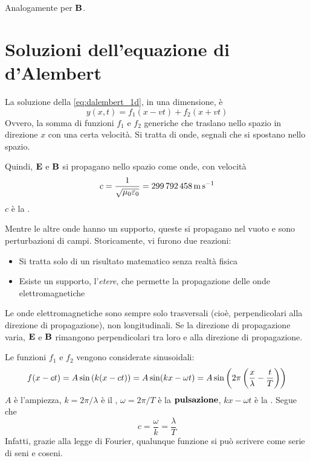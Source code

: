 Analogamente per $\mathbf{B}$.

\section{Soluzioni dell'equazione di d'Alembert}

La soluzione della \eqref{eq:dalembert_1d}, in una dimensione, è
\begin{equation}
    y(x, t) = f_1(x - vt) + f_2(x + vt)
\end{equation}
Ovvero, la somma di funzioni $f_1$ e $f_2$ generiche che traslano nello spazio in direzione $x$ con una certa velocità.
Si tratta di onde, segnali che si spostano nello spazio.

Quindi, $\mathbf{E}$ e $\mathbf{B}$ si propagano nello spazio come onde, con velocità
\begin{equation}
    c = \frac{1}{\sqrt{\mu_0 \varepsilon_0}} = \qty{299792458}{\metre\per\second}
\end{equation}
$c$ è la .

Mentre le altre onde hanno un supporto, queste si propagano nel vuoto e sono perturbazioni di campi.
Storicamente, vi furono due reazioni:
\begin{itemize}
    \item Si tratta solo di un risultato matematico senza realtà fisica
    \item Esiste un supporto, l'\textit{etere}, che permette la propagazione delle onde elettromagnetiche
\end{itemize}

Le onde elettromagnetiche sono sempre solo trasversali (cioè, perpendicolari alla direzione di propagazione), non longitudinali.
Se la direzione di propagazione varia, $\mathbf{E}$ e $\mathbf{B}$ rimangono perpendicolari tra loro e alla direzione di propagazione.

Le funzioni $f_1$ e $f_2$ vengono considerate sinusoidali:
\begin{equation}
    f(x - c t) = A \sin\left( k (x - c t) \right) = A \sin(k x - \omega t)
    = A \sin\left( 2\pi \left( \frac{x}{\lambda} - \frac{t}{T} \right) \right)
\end{equation}
$A$ è l'ampiezza, $k = 2\pi / \lambda$ è il , $\omega = 2\pi / T$ è la $\textbf{pulsazione}$, $k x - \omega t$ è la .
Segue che
\begin{equation}
    c = \frac{\omega}{k} = \frac{\lambda}{T}
\end{equation}
Infatti, grazie alla legge di Fourier, qualunque funzione si può scrivere come serie di seni e coseni.

